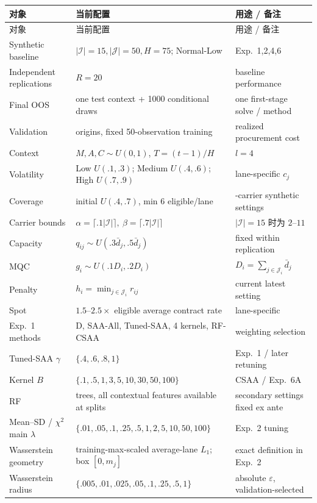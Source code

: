 \documentclass[11pt,a4paper]{ctexart}
\newcommand{\I}{\mathcal I}
\newcommand{\J}{\mathcal J}
\begin{document}
\begin{center}
\small
\begin{longtable}{>{\raggedright\arraybackslash}p{3.6cm} >{\raggedright\arraybackslash}p{7.1cm} >{\raggedright\arraybackslash}p{4.0cm}}
\toprule
对象 & 当前配置 & 用途 / 备注\\
\midrule
\endfirsthead
\toprule
对象 & 当前配置 & 用途 / 备注\\
\midrule
\endhead
Synthetic baseline & $|\I|=15, |\J|=50, H=75$; Normal-Low & Exp.~1,2,4,6\\
Independent replications & $R=20$ & baseline performance\\
Final OOS & one test context + 1000 conditional draws & one first-stage solve / method\\
Validation & 25 origins, fixed 50-observation training & realized procurement cost\\
Context & $M,A,C\sim U(0,1)$, $T=(t-1)/H$ & $l=4$\\
Volatility & Low $U(.1,.3)$; Medium $U(.4,.6)$; High $U(.7,.9)$ & lane-specific $c_j$\\
Coverage & initial $U(.4,.7)$, min 6 eligible/lane & 15-carrier synthetic settings\\
Carrier bounds & $\alpha=\lceil .1|\I|\rceil,\ \beta=\lceil .7|\I|\rceil$ & $|\I|=15$ 时为 $2$--$11$\\
Capacity & $q_{ij}\sim U(.3\bar d_j,.5\bar d_j)$ & fixed within replication\\
MQC & $g_i\sim U(.1D_i,.2D_i)$ & $D_i=\sum_{j\in\J_i}\bar d_j$\\
Penalty & $h_i=\min_{j\in\J_i}r_{ij}$ & current latest setting\\
Spot & $1.5$--$2.5\times$ eligible average contract rate & lane-specific\\
Exp.~1 methods & D, SAA-All, Tuned-SAA, 4 kernels, RF-CSAA & weighting selection\\
Tuned-SAA $\gamma$ & $\{.4,.6,.8,1\}$ & Exp.~1 / later retuning\\
Kernel $B$ & $\{.1,.5,1,3,5,10,30,50,100\}$ & CSAA / Exp.~6A\\
RF & 500 trees, all contextual features available at splits & secondary settings fixed ex ante\\
Mean--SD / $\chi^2$ main $\lambda$ & $\{.01,.05,.1,.25,.5,1,2,5,10,50,100\}$ & Exp.~2 tuning\\
Wasserstein geometry & training-max-scaled average-lane $L_1$; box $[0,m_j]$ & exact definition in Exp.~2\\
Wasserstein radius & $\{.005,.01,.025,.05,.1,.25,.5,1\}$ & absolute $\varepsilon$, validation-selected\\

\end{longtable}
\end{center}
\end{document}
